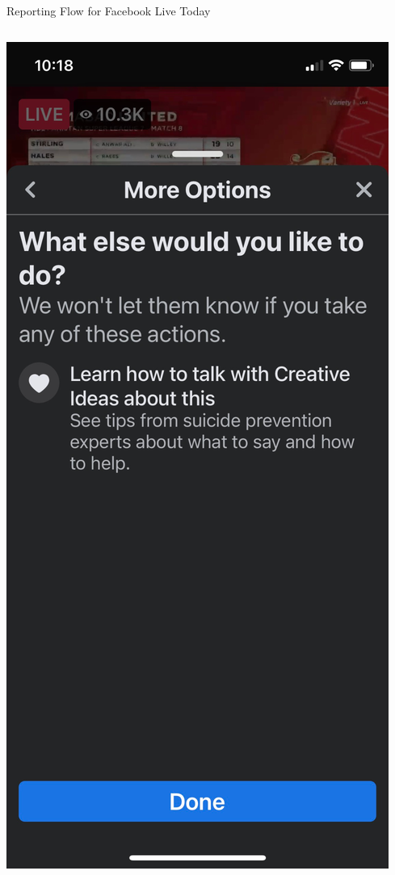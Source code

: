 \documentclass[nobackground,dvipsnames,table]{beamer}
\begin{document}
\begin{frame}{Reporting Flow for Facebook Live Today}
\begin{columns}
            \includegraphics[width=\textwidth]{facebook-live-current-reporting-flow-3}

\end{columns}
\end{frame}
\end{document}

